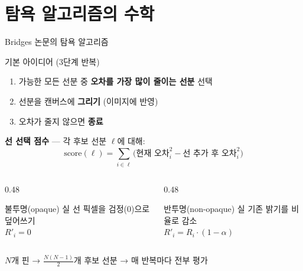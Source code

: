 \documentclass[10pt,aspectratio=169]{beamer}
\begin{document}
\section{탐욕 알고리즘의 수학}

\begin{frame}{Bridges 논문의 탐욕 알고리즘}
  \begin{block}{기본 아이디어 (3단계 반복)}
    \begin{enumerate}
      \item 가능한 모든 선분 중 \textbf{오차를 가장 많이 줄이는 선분} 선택
      \item 선분을 캔버스에 \textbf{그리기} (이미지에 반영)
      \item 오차가 줄지 않으면 \textbf{종료}
    \end{enumerate}
  \end{block}

  \vspace{0.3cm}
  \textbf{선 선택 점수} — 각 후보 선분 $\ell$에 대해:
  \[
    \text{score}(\ell) = \sum_{i \in \ell} \bigl(\text{현재 오차}_i^2 - \text{선 추가 후 오차}_i^2\bigr)
  \]

  \vspace{0.2cm}
  \begin{columns}[T]
    \begin{column}{0.48\textwidth}
      \begin{exampleblock}{불투명(opaque) 실}
        선 픽셀을 검정(0)으로 덮어쓰기\\
        $R'_i = 0$
      \end{exampleblock}
    \end{column}
    \begin{column}{0.48\textwidth}
      \begin{exampleblock}{반투명(non-opaque) 실}
        기존 밝기를 비율로 감소\\
        $R'_i = R_i \cdot (1 - \alpha)$
      \end{exampleblock}
    \end{column}
  \end{columns}

  \vspace{0.3cm}
  $N$개 핀 → $\frac{N(N{-}1)}{2}$개 후보 선분 → 매 반복마다 전부 평가
\end{frame}
\end{document}
